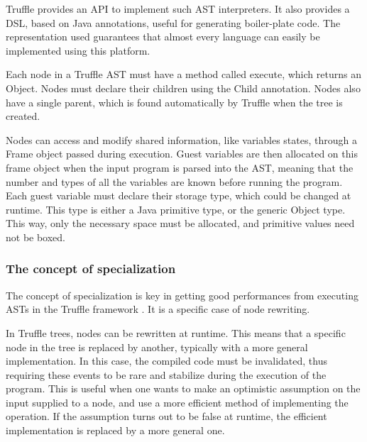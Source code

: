 \documentclass[twoside,11pt,a4paper]{article}
\newcommand{\java}[1]{\textsf{#1}}
\begin{document}

Truffle provides an API to implement such AST interpreters. It also provides a DSL, based on Java annotations, useful for generating boiler-plate code. The representation used guarantees that almost every language can easily be implemented using this platform.

Each node in a Truffle AST must have a method called \java{execute}, which returns an \java{Object}. Nodes must declare their children using the \java{Child} annotation. Nodes also have a single parent, which is found automatically by Truffle when the tree is created.

Nodes can access and modify shared information, like variables states, through a \java{Frame} object passed during execution. Guest variables are then allocated on this frame object when the input program is parsed into the AST, meaning that the number and types of all the variables are known before running the program. Each guest variable must declare their storage type, which could be changed at runtime. This type is either a Java primitive type, or the generic \java{Object} type. This way, only the necessary space must be allocated, and primitive values need not be boxed.


\subsubsection{The concept of specialization}

The concept of specialization is key in getting good performances from executing ASTs in the Truffle framework \cite{trufflespec, truffledsl}. It is a specific case of node rewriting.

In Truffle trees, nodes can be rewritten at runtime. This means that a specific node in the tree is replaced by another, typically with a more general implementation. In this case, the compiled code must be invalidated, thus requiring these events to be rare and stabilize during the execution of the program. This is useful when one wants to make an optimistic assumption on the input supplied to a node, and use a more efficient method of implementing the operation. If the assumption turns out to be false at runtime, the efficient implementation is replaced by a more general one.
\end{document}
